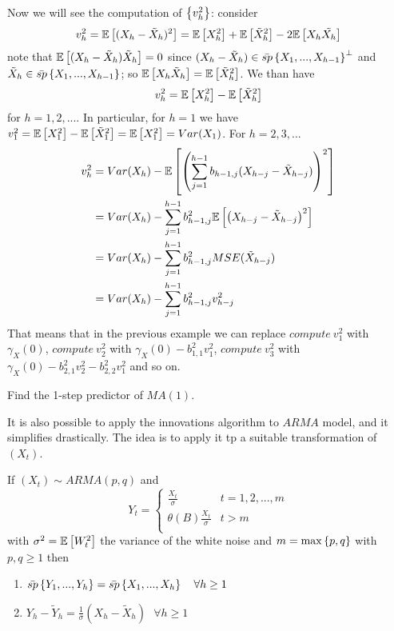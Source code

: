 Now we will see the computation of $\left\{v_h^2\right\}$: consider
\[
    v_h^2=\mathbb{E}\left[(X_h-\tilde{X}_h)^2\right]=\mathbb{E}\left[X_h^2\right]+\mathbb{E}\left[\tilde{X}_h^2\right]-2\mathbb{E}\left[X_h\tilde{X_h}\right]    
\]
note that $\mathbb{E}\left[(X_h-\tilde{X}_h)\tilde{X}_h\right]=0$ since $(X_h-\tilde{X}_h)\in\bar{sp}\left\{X_1,...,X_{h-1}\right\}^\perp$ and $\tilde{X}_h\in\bar{sp}\left\{X_1,...,X_{h-1}\right\}$; so $\mathbb{E}\left[X_h\tilde{X}_h\right]=\mathbb{E}\left[\tilde{X}_h^2\right]$. We than have
\[
    v_h^2=\mathbb{E}\left[X_h^2\right]-\mathbb{E}\left[\tilde{X}_h^2\right]
\]
for $h=1,2,...$. In particular, for $h=1$ we have $v_1^2=\mathbb{E}\left[X_1^2\right]-\mathbb{E}\left[\tilde{X}_1^2\right]=\mathbb{E}\left[X_1^2\right]=Var(X_1)$. For $h=2,3,...$
\begin{equation*}
    \begin{split}
        v_h^2&=Var(X_h)-\mathbb{E}\left[\left(\sum_{j=1}^{h-1}b_{h-1,j}(X_{h-j}-\tilde{X}_{h-j})\right)^2\right]\\
        &=Var(X_h)-\sum_{j=1}^{h-1}b_{h-1,j}^2\mathbb{E}\left[\left(X_{h-j}-\tilde{X}_{h-j}\right)^2\right]\\
        &=Var(X_h)-\sum_{j=1}^{h-1}b_{h-1,j}^2MSE(\tilde{X}_{h-j})\\
        &=Var(X_h)-\sum_{j=1}^{h-1}b_{h-1,j}^2v_{h-j}^2\\
    \end{split}
\end{equation*}
That means that in the previous example we can replace $compute\ v_1^2$ with $\gamma_X(0)$, $compute\ v_2^2$ with $\gamma_X(0)-b_{1,1}^2v_1^2$, $compute\ v_3^2$ with $\gamma_X(0)-b_{2,1}^2v_2^2-b_{2,2}^2v_1^2$ and so on. 

\begin{exercise}
    Find the 1-step predictor of $MA(1)$.
\end{exercise}

It is also possible to apply the innovations algorithm to $ARMA$ model, and it simplifies drastically. The idea is to apply it tp a suitable transformation of $(X_t)$.

\begin{proposition}
    If $(X_t)\sim ARMA(p,q)$ and    
    \[
        Y_t=
        \begin{cases}
            \frac{X_t}{\sigma}&t=1,2,...,m\\
            \theta(B)\frac{X_t}{\sigma}&t>m\\
        \end{cases}  
    \]
    with $\sigma^2=\mathbb{E}\left[W_t^2\right]$ the variance of the white noise and $m=\max\left\{p,q\right\}$ with $p,q\ge1$ then
    \begin{enumerate}
        \item $\mean{sp}\set{Y_1,...,Y_h}=\mean{sp}\set{X_1,...,X_h}\ \ \ \forall h\ge1$
        \item $Y_h-\tilde{Y}_h=\frac{1}{\sigma}(X_h-\tilde{X}_h)\ \ \ \forall h\ge1$
    \end{enumerate}
\end{proposition}

